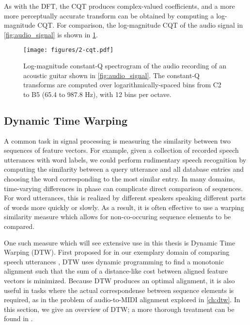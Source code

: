 As with the DFT, the CQT produces complex-valued coefficients, and a more more perceptually accurate transform can be obtained by computing a log-magnitude CQT.
For comparison, the log-magnitude CQT of the audio signal in \cref{fig:audio_signal} is shown in \cref{fig:cqt}.

\begin{figure}
  \centering
  \texttt{[image: figures/2-cqt.pdf]}
  \caption[Log-magnitude constant-Q spectrogram of the acoustic guitar recording]{Log-magnitude constant-Q spectrogram of the audio recording of an acoustic guitar shown in \cref{fig:audio_signal}.
  The constant-Q transforms are computed over logarithmically-spaced bins from C2 to B5 (65.4 to 987.8 Hz), with 12 bins per octave.}
  \label{fig:cqt}
\end{figure}

\subsection{Dynamic Time Warping}
\label{sec:dtw}

A common task in signal processing is measuring the similarity between two sequences of feature vectors.
For example, given a collection of recorded speech utterances with word labels, we could perform rudimentary speech recognition by computing the similarity between a query utterance and all database entries and choosing the word corresponding to the most similar entry.
In many domains, time-varying differences in phase can complicate direct comparison of sequences.
For word utterances, this is realized by different speakers speaking different parts of words more quickly or slowly.
As a result, it is often effective to use a warping similarity measure which allows for non-co-occuring sequence elements to be compared.

One such measure which will see extensive use in this thesis is Dynamic Time Warping (DTW).
First proposed for in our exemplary domain of comparing speech utterances \cite{sakoe1978dynamic}, DTW uses dynamic programming to find a monotonic alignment such that the sum of a distance-like cost between aligned feature vectors is minimized.
Because DTW produces an optimal alignment, it is also useful in tasks where the actual correspondense between sequence elements is required, as in the problem of audio-to-MIDI alignment explored in \cref{ch:dtw}.
In this section, we give an overview of DTW; a more thorough treatment can be found in \cite{muller2007dynamic}.

